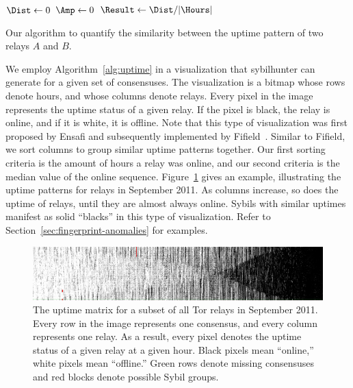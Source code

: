 \begin{algorithm}[t]

\Output{$\Result$}
\BlankLine
$\Dist \leftarrow 0$\;
$\Amp \leftarrow 0$\;
$\Result \leftarrow \Dist / \lvert \Hours \rvert$\;
\caption{Our algorithm to quantify the similarity between the uptime pattern
of two relays $A$ and $B$.}
\label{alg:uptime}
\end{algorithm}

We employ Algorithm~\ref{alg:uptime} in a visualization that sybilhunter can
generate for a given set of consensuses.  The visualization is a bitmap whose
rows denote hours, and whose columns denote relays.  Every pixel in the image
represents the uptime status of a given relay.  If the pixel is black, the relay
is online, and if it is white, it is offline.  Note that this type of
visualization was first proposed by Ensafi and subsequently implemented by
Fifield~\cite{Fifield2014a}.  Similar to Fifield, we sort columns to group
similar uptime patterns together.  Our first sorting criteria is the amount of
hours a relay was online, and our second criteria is the median value of the
online sequence.  Figure~\ref{fig:uptime-matrix} gives an example, illustrating
the uptime patterns for relays in September 2011.  As columns increase, so does
the uptime of relays, until they are almost always online.  Sybils with similar
uptimes manifest as solid ``blacks'' in this type of visualization.  Refer to
Section~\ref{sec:fingerprint-anomalies} for examples.

\begin{figure}[t]
	\centering
	\includegraphics[width=\linewidth]{diagrams/2011-09-uptimes-truncated.jpg}
	\caption{The uptime matrix for a subset of all Tor relays in September 2011.
		Every row in the image represents one consensus, and every column
		represents one relay.  As a result, every pixel denotes the uptime
		status of a given relay at a given hour.  Black pixels mean ``online,''
		white pixels mean ``offline.''  Green rows denote missing consensuses
		and red blocks denote possible Sybil groups.}
	\label{fig:uptime-matrix}
\end{figure}

